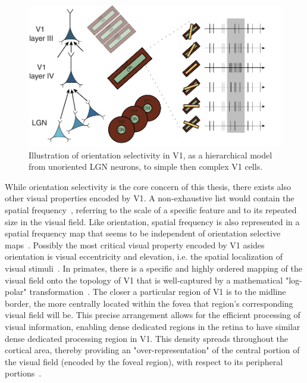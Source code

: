 \begin{figure}[h!tbp]
\vspace{0.5cm}
\centering
\includegraphics[width=.9\textwidth]{fig/chap2_fig_V1_ori_selec.pdf}
\caption[Illustration of orientation selectivity in V1.]{Illustration of orientation selectivity in \gls{V1}, as a hierarchical model~\cite{hubel1962receptive} from unoriented \gls{LGN} neurons, to simple then complex \gls{V1} cells.}
\label{fig_chap2_vision_V1_ori_selec}
\end{figure}

While orientation selectivity is the core concern of this thesis, there exists also other visual properties encoded by \gls{V1}. A non-exhaustive list would contain the spatial frequency~\cite{tolhurst1981variety}, referring to the scale of a specific feature and to its repeated size in the visual field. Like orientation, spatial frequency is also represented in a spatial frequency map that seems to be independent of orientation selective maps~\cite{issa2000spatial}. Possibly the most critical visual property encoded by \gls{V1} asides orientation is visual eccentricity and elevation, i.e. the spatial localization of visual stimuli~\cite{wandell2007visual}. In primates, there is a specific and highly ordered mapping of the visual field onto the topology of \gls{V1} that is well-captured by a mathematical "log-polar" transformation~\cite{traver2010review}. The closer a particular region of \gls{V1} is to the midline border, the more centrally located within the fovea that region's corresponding visual field will be. This precise arrangement allows for the efficient processing of visual information, enabling dense dedicated regions in the retina to have similar dense dedicated processing region in \gls{V1}. This density spreads throughout the cortical area, thereby providing an "over-representation" of the central portion of the visual field (encoded by the foveal region), with respect to its peripheral portions~\cite{jeremie2023retinotopy}.


